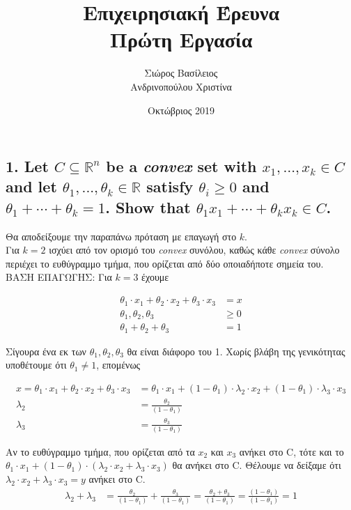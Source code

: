 \documentclass[12pt]{article}
\title{\hugeΑλγοριθμική Επιχειρησιακή Έρευνα\\Πρώτη Εργασία}
\author{Σιώρος Βασίλειος\\Ανδρινοπούλου Χριστίνα}
\date{Οκτώβριος 2019}
\newcommand{\R}{\mathbb{R}}
\begin{document}
\maketitle
\thispagestyle{empty}

\pagebreak


\subsection*{1. Let $C \subseteq \R^n$ be a \textit{convex} set with $x_1 , \dotsc, x_k \in C$ and let $θ_1 , . . . , θ_k \in \R$ satisfy $θ_i \geq 0$ and
$θ_1 + \dotsb + θ_k = 1$. Show that $θ_1x_1 + \dotsb + θ_kx_k \in C$.}

Θα αποδείξουμε την παραπάνω πρόταση με επαγωγή στο $k$.\\

Για $k = 2$ ισχύει από τον ορισμό του \textit{convex} συνόλου,
καθώς κάθε \textit{convex} σύνολο περιέχει το ευθύγραμμο τμήμα, που ορίζεται από δύο οποιαδήποτε σημεία του.\\

ΒΑΣΗ ΕΠΑΓΩΓΗΣ: Για $k = 3$ έχουμε 

\begin{align*}
    θ_1 \cdot x_1 + θ_2 \cdot x_2 + θ_3 \cdot x_3 & = x \\ 
    θ_1, θ_2, θ_3 & \geq 0 \\
    θ_1 + θ_2 + θ_3 & = 1
\end{align*}

Σίγουρα ένα εκ των $θ_1, θ_2, θ_3$ θα είναι διάφορο του 1. Χωρίς βλάβη της γενικότητας υποθέτουμε ότι 
$θ_1 \neq 1$, επομένως

\begin{align*}
    x = θ_1 \cdot x_1 +  θ_2 \cdot x_2 + θ_3 \cdot x_3 & = θ_1 \cdot x_1 + (1 - θ_1) \cdot λ_2 \cdot x_2 + (1 - θ_1) \cdot λ_3 \cdot x_3 \\
    λ_2 & = \frac{θ_2}{(1 - θ_1)} \\
    λ_3 & = \frac{θ_3}{(1 - θ_1)}
\end{align*}

Αν το ευθύγραμμο τμήμα, που ορίζεται από τα $x_2$ και $x_3$ ανήκει στο C, τότε και το 
$θ_1 \cdot x_1 + (1 - θ_1) \cdot (λ_2 \cdot x_2 + λ_3 \cdot x_3)$ θα ανήκει στο C. Θέλουμε να δείξαμε ότι $λ_2 \cdot x_2 + λ_3 \cdot x_3 = y$ ανήκει στο C. \\

\begin{align*}
    λ_2 + λ_3 & = \frac{θ_2}{(1 - θ_1)} + \frac{θ_3}{(1 - θ_1)} = \frac{θ_2 + θ_3}{(1 - θ_1)} = \frac{(1 - θ_1)}{(1 - θ_1)} = 1
\end{align*}
\end{document}
